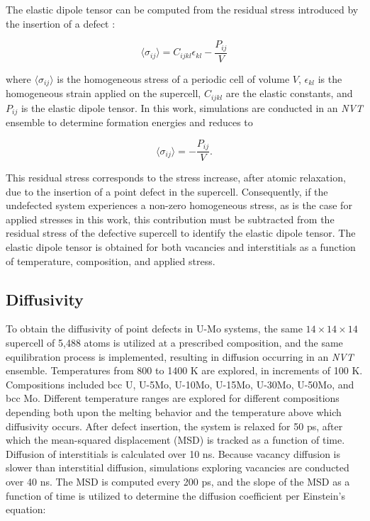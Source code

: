 \documentclass[review]{elsarticle}
\begin{document}
The elastic dipole tensor can be computed from the residual stress introduced by the insertion of a defect \cite{varvenne2017}:

\begin{equation}\label{eq:dipole1}
    \langle \sigma_{ij} \rangle = C_{ijkl}\epsilon_{kl} - \frac{P_{ij}}{V}
\end{equation}

\noindent where $\langle \sigma_{ij} \rangle$ is the homogeneous stress of a periodic cell of volume $V$, $\epsilon_{kl}$ is the homogeneous strain applied on the supercell, $C_{ijkl}$ are the elastic constants, and $P_{ij}$ is the elastic dipole tensor. In this work, simulations are conducted in an \textit{NVT} ensemble to determine formation energies and  reduces to 

\begin{equation}\label{eq:dipole2}
    \langle \sigma_{ij} \rangle = - \frac{P_{ij}}{V}.
\end{equation}

This residual stress corresponds to the stress increase, after atomic relaxation, due to the insertion of a point defect in the supercell. Consequently, if the undefected system experiences a non-zero homogeneous stress, as is the case for applied stresses in this work, this contribution must be subtracted from the residual stress of the defective supercell to identify the elastic dipole tensor. The elastic dipole tensor is obtained for both vacancies and interstitials as a function of temperature, composition, and applied stress.

\subsection{Diffusivity}

To obtain the diffusivity of point defects in U-Mo systems, the same $14 \times 14 \times 14$ supercell of 5,488 atoms is utilized at a prescribed composition, and the same equilibration process is implemented, resulting in diffusion occurring in an \textit{NVT} ensemble. Temperatures from 800 to 1400 K are explored, in increments of 100 K. Compositions included bcc U, U-5Mo, U-10Mo, U-15Mo, U-30Mo, U-50Mo, and bcc Mo. Different temperature ranges are explored for different compositions depending both upon the melting behavior and the temperature above which diffusivity occurs. After defect insertion, the system is relaxed for 50 ps, after which the mean-squared displacement (MSD) is tracked as a function of time. Diffusion of interstitials is calculated over 10 ns. Because vacancy diffusion is slower than interstitial diffusion, simulations exploring vacancies are conducted over 40 ns. The MSD is computed every 200 ps, and the slope of the MSD as a function of time is utilized to determine the diffusion coefficient per Einstein's equation:
\end{document}
